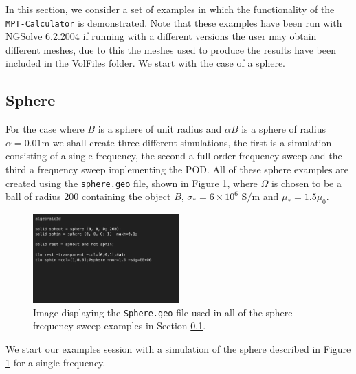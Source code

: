In this section, we consider a set of examples in which the functionality of the \texttt{MPT-Calculator} is demonstrated. Note that these examples have been run with NGSolve 6.2.2004 if running with a different versions the user may obtain different meshes, due to this the meshes used to produce the results have been included in the VolFiles folder. We start with the case of a sphere.
\subsection{Sphere}\label{sectSphereSweeps}
For the case where $B$ is a sphere of unit radius and $\alpha B$ is a sphere of radius $\alpha=0.01 \text{m}$ we shall create three different simulations, the first is a simulation consisting of a single frequency, the second a full order frequency sweep and the third a frequency sweep implementing the POD. All of these sphere examples are created using the \texttt{sphere.geo} file, shown in Figure \ref{fig:SweepSphere}, where $\Omega$ is chosen to be a ball of radius 200 containing the object $B$, $\sigma_*=6\times 10^6\text{ S/m}$ and $\mu_*=1.5\mu_0$.
\begin{figure}[H]
\begin{center}
\includegraphics[width=0.5\textwidth]{Figures/SweepSphere.png}
\caption{Image displaying the \texttt{Sphere.geo} file used in all of the sphere frequency sweep examples in Section \ref{sectSphereSweeps}.}\label{fig:SweepSphere}
\end{center}
\end{figure}
\noindent
We start our examples session with a simulation of the sphere described in Figure \ref{fig:SweepSphere} for a single frequency.
